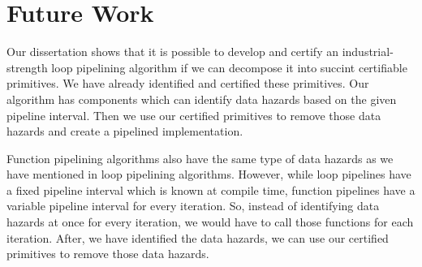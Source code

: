 \section{Future Work}
Our dissertation shows that it is possible to develop and certify an industrial-strength loop pipelining algorithm if we can decompose it into succint certifiable primitives. We have already identified and certified these primitives. Our algorithm has components which can identify data hazards based on the given pipeline interval. Then we use our certified primitives to remove those data hazards and create a pipelined implementation.

Function pipelining algorithms also have the same type of data hazards as we have mentioned in loop pipelining algorithms. However, while loop pipelines have a fixed pipeline interval which is known at compile time, function pipelines have a variable pipeline interval for every iteration. So, instead of identifying data hazards at once for every iteration, we would have to call those functions for each iteration. After, we have identified the data hazards, we can use our certified primitives to remove those data hazards.   